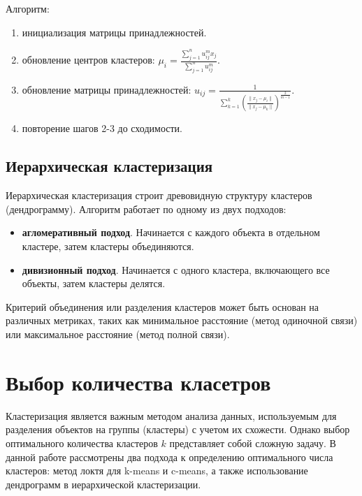 Алгоритм:

\begin{enumerate}
    \item инициализация матрицы принадлежностей.
    \item обновление центров кластеров:
        \begin{math}
        \mu_i = \frac{\sum_{j=1}^n u_{ij}^m x_j}{\sum_{j=1}^n u_{ij}^m}.
        \end{math}\cite{lib:cmeans}
    \item обновление матрицы принадлежностей:
        \begin{math}
        u_{ij} = \frac{1}{\sum_{k=1}^k \left(\frac{\|x_j - \mu_i\|}{\|x_j - \mu_k\|}\right)^{\frac{2}{m-1}}}.
        \end{math}\cite{lib:cmeans}
    \item повторение шагов 2-3 до сходимости.
\end{enumerate}

\subsection{Иерархическая кластеризация}
Иерархическая кластеризация строит древовидную структуру кластеров (дендрограмму). 
Алгоритм работает по одному из двух подходов:

\begin{itemize}
    \item \textbf{агломеративный подход}. Начинается с каждого объекта в отдельном кластере, затем кластеры объединяются.
    \item \textbf{дивизионный подход}. Начинается с одного кластера, включающего все объекты, затем кластеры делятся.
\end{itemize}

Критерий объединения или разделения кластеров может быть основан на различных метриках, 
таких как минимальное расстояние (метод одиночной связи) или максимальное расстояние (метод полной связи).

\section{Выбор количества класетров}
Кластеризация является важным методом анализа данных, используемым для разделения объектов на группы (кластеры) с учетом их схожести. 
Однако выбор оптимального количества кластеров $k$ представляет собой сложную задачу. 
В данной работе рассмотрены два подхода к определению оптимального числа кластеров: метод локтя для k-means и c-means, 
а также использование дендрограмм в иерархической кластеризации.

